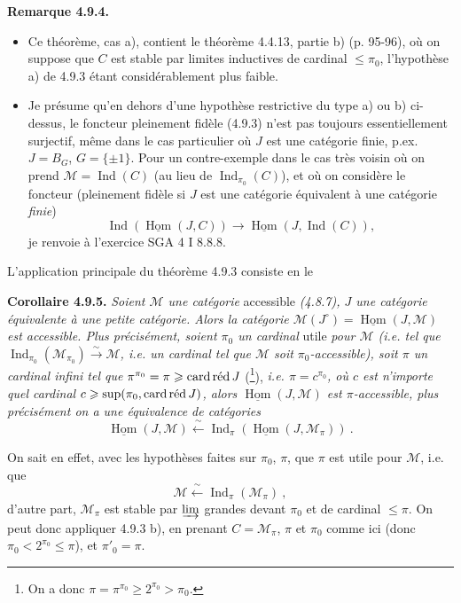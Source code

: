 \documentclass[11pt]{article}
\newcommand{\msp}[1]{\marginpar{\footnotesize [#1]}}
\newcommand{\Ind}{\operatorname{Ind}}
\newcommand{\cardred}{\mathop{\mathrm{card}\,\textup{réd}}\nolimits}
\newcommand{\uHom}{\underline{\operatorname{Hom}}}
\newcommand{\cM}{\mathcal{M}}
\begin{document}
\textbf{Remarque 4.9.4.}
\begin{itemize}[label={}]
\item[a)] Ce théorème, cas a), contient le théorème 4.4.13, partie b) (p. 95-96), où on suppose que $C$ est stable par limites inductives de cardinal $\leqslant \pi_0$, l'hypothèse a) de 4.9.3 étant considérablement plus faible.
\item[b)] \msp{page 220}Je présume qu'en dehors d'une hypothèse restrictive du type a) ou b) ci-dessus, le foncteur pleinement fidèle (4.9.3) n'est pas toujours essentiellement surjectif, même dans le cas particulier où $J$ est une catégorie finie, p.ex. $J = B_G$, $G = \{\pm 1\}$. Pour un contre-exemple dans le cas très voisin où on prend $\cM = \Ind(C)$ (au lieu de $\Ind_{\pi_0}(C)$), et où on considère le foncteur (pleinement fidèle si $J$ est une catégorie équivalent à une catégorie \textit{finie}) %
\[
\Ind(\uHom(J,C)) \longrightarrow \uHom(J,\Ind(C)),
\]
je renvoie à l'exercice SGA 4 I 8.8.8.
\end{itemize}
L'application principale du théorème 4.9.3 consiste en le

\textbf{Corollaire 4.9.5.} \textit{Soient $\cM$ une catégorie} accessible \textit{(4.8.7), $J$ une catégorie équivalente à une petite catégorie. Alors la catégorie $\cM(J^\circ) = \uHom(J,\cM)$ est accessible. Plus précisément, soient $\pi_0$ un cardinal} utile \textit{pour $\cM$ (i.e. tel que $\Ind_{\pi_0}(\cM_{\pi_0}) \xrightarrow{\sim} \cM$, i.e. un cardinal tel que $\cM$ soit $\pi_0$-accessible), soit $\pi$ un cardinal infini tel que $\pi^{\pi_0} = \pi \geqslant \cardred J$} (\footnote[95]{On a donc $\pi = \pi^{\pi_0} \geqslant 2^{\pi_0} > \pi_0$.}), \textit{i.e. $\pi = c^{\pi_0}$, où $c$ est n'importe quel cardinal $c \geqslant \sup(\pi_0, \cardred J)$, alors $\uHom(J,\cM)$ est $\pi$-accessible, plus précisément on a une équivalence de catégories} %
\[
\uHom(J,\cM) \xleftarrow{\ \sim\ } \Ind_\pi(\uHom(J,\cM_\pi)) \ . \tag*{(4.9.5.1)}
\]

\msp{page 221}On sait en effet, avec les hypothèses faites sur $\pi_0$, $\pi$, que $\pi$ est utile pour $\cM$, i.e. que
\[
\cM \xleftarrow{\ \sim\ } \Ind_\pi(\cM_\pi) \ ,
\]
d'autre part, $\cM_\pi$ est stable par $\varinjlim$ grandes devant $\pi_0$ et de cardinal $\leqslant \pi$. On peut donc appliquer 4.9.3 b), en prenant $C = \cM_\pi$, $\pi$ et $\pi_0$ comme ici (donc $\pi_0 < 2^{\pi_0} \leqslant \pi$), et $\pi'_0 = \pi$.
\end{document}
